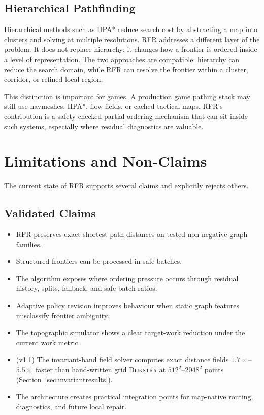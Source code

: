 \documentclass[11pt]{article}
\newcommand{\RFR}{\textsc{RFR}}
\newcommand{\Dijkstra}{\textsc{Dijkstra}}
\begin{document}
\subsection{Hierarchical Pathfinding}

Hierarchical methods such as HPA* \cite{botea2004} reduce search cost by abstracting a map into clusters and solving at multiple resolutions. \RFR{} addresses a different layer of the problem. It does not replace hierarchy; it changes how a frontier is ordered inside a level of representation. The two approaches are compatible: hierarchy can reduce the search domain, while \RFR{} can resolve the frontier within a cluster, corridor, or refined local region.

This distinction is important for games. A production game pathing stack may still use navmeshes, HPA*, flow fields, or cached tactical maps. \RFR{}'s contribution is a safety-checked partial ordering mechanism that can sit inside such systems, especially where residual diagnostics are valuable.

\section{Limitations and Non-Claims}
\label{sec:limitations}

The current state of \RFR{} supports several claims and explicitly rejects others.

\subsection{Validated Claims}

\begin{itemize}
  \item \RFR{} preserves exact shortest-path distances on tested non-negative graph families.
  \item Structured frontiers can be processed in safe batches.
  \item The algorithm exposes where ordering pressure occurs through residual history, splits, fallback, and safe-batch ratios.
  \item Adaptive policy revision improves behaviour when static graph features misclassify frontier ambiguity.
  \item The topographic simulator shows a clear target-work reduction under the current work metric.
  \item (v1.1) The invariant-band field solver computes exact distance fields $1.7\times$--$5.5\times$ faster than hand-written grid \Dijkstra{} at $512^2$--$2048^2$ points (Section~\ref{sec:invariantresults}).
  \item The architecture creates practical integration points for map-native routing, diagnostics, and future local repair.
\end{itemize}
\end{document}
